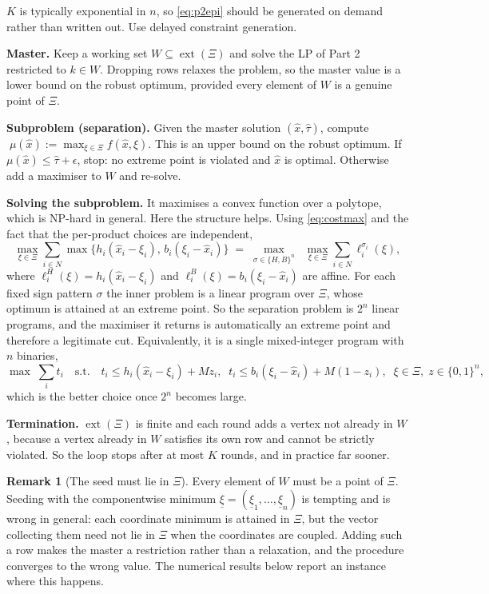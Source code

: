 \documentclass[11pt]{article}
\DeclareMathOperator{\ext}{ext}
\theoremstyle{definition}
\newtheorem{remark}{Remark}
\begin{document}
$K$ is typically exponential in $n$, so \eqref{eq:p2epi} should be
generated on demand rather than written out. Use delayed constraint
generation.

\textbf{Master.} Keep a working set $W \subseteq \ext(\Xi)$ and solve the
LP of Part 2 restricted to $k \in W$. Dropping rows relaxes the
problem, so the master value is a lower bound on the robust optimum,
provided every element of $W$ is a genuine point of $\Xi$.

\textbf{Subproblem (separation).} Given the master solution
$(\hat x, \hat\tau)$, compute
$\;\mu(\hat x) := \max_{\xi \in \Xi} f(\hat x, \xi)$. This is an upper
bound on the robust optimum. If $\mu(\hat x) \le \hat\tau + \epsilon$,
stop: no extreme point is violated and $\hat x$ is optimal. Otherwise add
a maximiser to $W$ and re-solve.

\textbf{Solving the subproblem.} It maximises a convex function over a
polytope, which is NP-hard in general. Here the structure helps. Using
\eqref{eq:costmax} and the fact that the per-product choices are
independent,
\[
  \max_{\xi\in\Xi} \sum_{i\in N}
     \max\{ h_i(\hat x_i - \xi_i),\, b_i(\xi_i - \hat x_i) \}
  \;=\;
  \max_{\sigma \in \{H,B\}^{n}} \;\; \max_{\xi \in \Xi}
     \sum_{i \in N} \ell^{\sigma_i}_i(\xi),
\]
where $\ell^{H}_i(\xi) = h_i(\hat x_i-\xi_i)$ and
$\ell^{B}_i(\xi) = b_i(\xi_i-\hat x_i)$ are affine. For each fixed sign
pattern $\sigma$ the inner problem is a linear program over $\Xi$, whose
optimum is attained at an extreme point. So the separation problem is
$2^{n}$ linear programs, and the maximiser it returns is automatically an
extreme point and therefore a legitimate cut. Equivalently, it is a single
mixed-integer program with $n$ binaries,
\[
  \max \;\sum_i t_i \quad\text{s.t.}\quad
  t_i \le h_i(\hat x_i-\xi_i) + Mz_i,\;\;
  t_i \le b_i(\xi_i-\hat x_i) + M(1-z_i),\;\;
  \xi \in \Xi,\; z \in \{0,1\}^n,
\]
which is the better choice once $2^{n}$ becomes large.

\textbf{Termination.} $\ext(\Xi)$ is finite and each round adds a vertex
not already in $W$, because a vertex already in $W$ satisfies its own row
and cannot be strictly violated. So the loop stops after at most $K$
rounds, and in practice far sooner.

\begin{remark}[The seed must lie in $\Xi$]
\label{rem:seed}
Every element of $W$ must be a point of $\Xi$. Seeding with the
componentwise minimum $\underline{\xi} = (\underline{\xi}_1,\dots,
\underline{\xi}_n)$ is tempting and is wrong in general: each coordinate
minimum is attained in $\Xi$, but the vector collecting them need not lie
in $\Xi$ when the coordinates are coupled. Adding such a row makes the
master a restriction rather than a relaxation, and the procedure converges
to the wrong value. The numerical results below report an instance where
this happens.
\end{remark}
\end{document}
